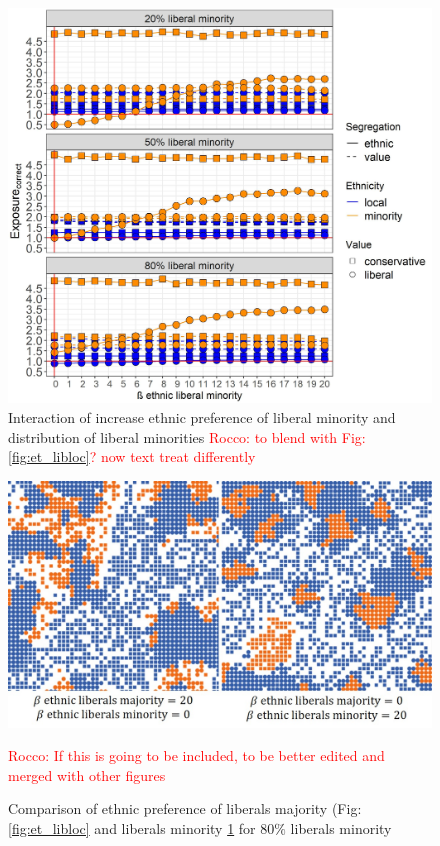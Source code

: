 \documentclass{article}
\newcommand{\rocco}[1]{{\textcolor{red}{Rocco: #1}}} %
\begin{document}
\begin{figure}[H]
    \centering
    \includegraphics[scale=0.5]{material/figures/et_libmin.jpg}
    \caption{Interaction of increase ethnic preference of liberal minority and distribution of liberal minorities \rocco{to blend with Fig: \ref{fig:et_libloc}? now text treat differently}}
    \label{fig:et_libmin}
\end{figure} %

\begin{figure}[H]
    \centering
    \includegraphics[scale=0.5]{material/figures/80_comp_eth.jpg}
    \caption{Comparison of ethnic preference of liberals majority (Fig: \ref{fig:et_libloc} and liberals minority \ref{fig:et_libmin} for $80 \%$ liberals minority} \rocco{If this is going to be included, to be better edited and merged with other figures}
    \label{fig:80_etlib}
\end{figure} %
\end{document}
